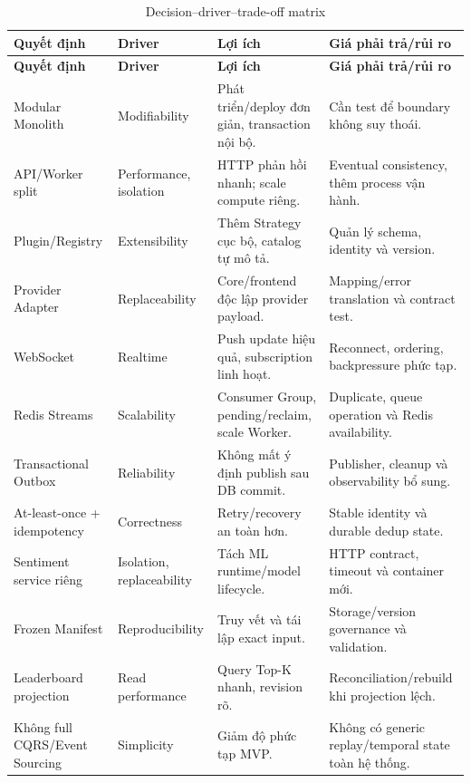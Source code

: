 \documentclass[12pt,a4paper,oneside]{report}
\begin{document}
\begin{longtable}{L{3cm}L{2.5cm}L{4cm}L{4cm}}
  \caption{Decision--driver--trade-off matrix}\label{tab:tradeoffs}\\
  \toprule
  \textbf{Quyết định} & \textbf{Driver} & \textbf{Lợi ích} & \textbf{Giá phải trả/rủi ro} \\
  \midrule
  \endfirsthead
  \toprule
  \textbf{Quyết định} & \textbf{Driver} & \textbf{Lợi ích} & \textbf{Giá phải trả/rủi ro} \\
  \midrule
  \endhead
  Modular Monolith & Modifiability & Phát triển/deploy đơn giản, transaction nội bộ. & Cần test để boundary không suy thoái. \\
  API/Worker split & Performance, isolation & HTTP phản hồi nhanh; scale compute riêng. & Eventual consistency, thêm process vận hành. \\
  Plugin/Registry & Extensibility & Thêm Strategy cục bộ, catalog tự mô tả. & Quản lý schema, identity và version. \\
  Provider Adapter & Replaceability & Core/frontend độc lập provider payload. & Mapping/error translation và contract test. \\
  WebSocket & Realtime & Push update hiệu quả, subscription linh hoạt. & Reconnect, ordering, backpressure phức tạp. \\
  Redis Streams & Scalability & Consumer Group, pending/reclaim, scale Worker. & Duplicate, queue operation và Redis availability. \\
  Transactional Outbox & Reliability & Không mất ý định publish sau DB commit. & Publisher, cleanup và observability bổ sung. \\
  At-least-once + idempotency & Correctness & Retry/recovery an toàn hơn. & Stable identity và durable dedup state. \\
  Sentiment service riêng & Isolation, replaceability & Tách ML runtime/model lifecycle. & HTTP contract, timeout và container mới. \\
  Frozen Manifest & Reproducibility & Truy vết và tái lập exact input. & Storage/version governance và validation. \\
  Leaderboard projection & Read performance & Query Top-K nhanh, revision rõ. & Reconciliation/rebuild khi projection lệch. \\
  Không full CQRS/Event Sourcing & Simplicity & Giảm độ phức tạp MVP. & Không có generic replay/temporal state toàn hệ thống. \\
  \bottomrule
\end{longtable}
\end{document}
